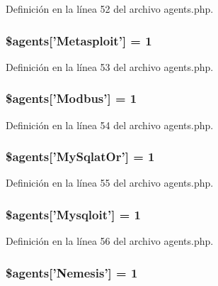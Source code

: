 Definición en la línea 52 del archivo agents.\-php.

\hypertarget{agents_8php_a96323ef65926b3182050993e76bac0af}{
\subsubsection[{\$agents}]{\setlength{\rightskip}{0pt plus 5cm}\$agents\mbox{[}'Metasploit'\mbox{]} = 1}}\label{agents_8php_a96323ef65926b3182050993e76bac0af}


Definición en la línea 53 del archivo agents.\-php.

\hypertarget{agents_8php_a5dd76023063ae3fbf481e1af09cc9e1a}{
\subsubsection[{\$agents}]{\setlength{\rightskip}{0pt plus 5cm}\$agents\mbox{[}'Modbus'\mbox{]} = 1}}\label{agents_8php_a5dd76023063ae3fbf481e1af09cc9e1a}


Definición en la línea 54 del archivo agents.\-php.

\hypertarget{agents_8php_a83504205f0eee3256ff9ee66e5ebf924}{
\subsubsection[{\$agents}]{\setlength{\rightskip}{0pt plus 5cm}\$agents\mbox{[}'My\-Sqlat\-Or'\mbox{]} = 1}}\label{agents_8php_a83504205f0eee3256ff9ee66e5ebf924}


Definición en la línea 55 del archivo agents.\-php.

\hypertarget{agents_8php_a98b7d1505316546d66f994234dac3f76}{
\subsubsection[{\$agents}]{\setlength{\rightskip}{0pt plus 5cm}\$agents\mbox{[}'Mysqloit'\mbox{]} = 1}}\label{agents_8php_a98b7d1505316546d66f994234dac3f76}


Definición en la línea 56 del archivo agents.\-php.

\hypertarget{agents_8php_a43fb49ecebc2d01e60f716f66f125b70}{
\subsubsection[{\$agents}]{\setlength{\rightskip}{0pt plus 5cm}\$agents\mbox{[}'Nemesis'\mbox{]} = 1}}\label{agents_8php_a43fb49ecebc2d01e60f716f66f125b70}


